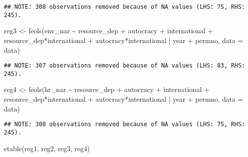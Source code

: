\documentclass[
]{article}
\newenvironment{Shaded}{\begin{snugshade}}{\end{snugshade}}
\newcommand{\AttributeTok}[1]{\textcolor[rgb]{0.77,0.63,0.00}{#1}}
\newcommand{\FunctionTok}[1]{\textcolor[rgb]{0.00,0.00,0.00}{#1}}
\newcommand{\NormalTok}[1]{#1}
\newcommand{\OtherTok}[1]{\textcolor[rgb]{0.56,0.35,0.01}{#1}}
\newcommand{\SpecialCharTok}[1]{\textcolor[rgb]{0.00,0.00,0.00}{#1}}
\begin{document}
\begin{verbatim}
## NOTE: 308 observations removed because of NA values (LHS: 75, RHS: 245).
\end{verbatim}

\begin{Shaded}
\begin{Highlighting}[]
\NormalTok{reg3 }\OtherTok{\textless{}{-}} \FunctionTok{feols}\NormalTok{(env\_nar }\SpecialCharTok{\textasciitilde{}}\NormalTok{ resource\_dep }\SpecialCharTok{+}\NormalTok{ autocracy }\SpecialCharTok{+}\NormalTok{ international }
              \SpecialCharTok{+}\NormalTok{ resource\_dep}\SpecialCharTok{*}\NormalTok{international }\SpecialCharTok{+}\NormalTok{ autocracy}\SpecialCharTok{*}\NormalTok{international }\SpecialCharTok{|}\NormalTok{ year }\SpecialCharTok{+}\NormalTok{ permno, }
              \AttributeTok{data =}\NormalTok{ data)}
\end{Highlighting}
\end{Shaded}

\begin{verbatim}
## NOTE: 307 observations removed because of NA values (LHS: 83, RHS: 245).
\end{verbatim}

\begin{Shaded}
\begin{Highlighting}[]
\NormalTok{reg4 }\OtherTok{\textless{}{-}} \FunctionTok{feols}\NormalTok{(hr\_nar }\SpecialCharTok{\textasciitilde{}}\NormalTok{ resource\_dep }\SpecialCharTok{+}\NormalTok{ autocracy }\SpecialCharTok{+}\NormalTok{ international }
              \SpecialCharTok{+}\NormalTok{ resource\_dep}\SpecialCharTok{*}\NormalTok{international }\SpecialCharTok{+}\NormalTok{ autocracy}\SpecialCharTok{*}\NormalTok{international }\SpecialCharTok{|}\NormalTok{ year }\SpecialCharTok{+}\NormalTok{ permno, }
              \AttributeTok{data =}\NormalTok{ data)}
\end{Highlighting}
\end{Shaded}

\begin{verbatim}
## NOTE: 308 observations removed because of NA values (LHS: 75, RHS: 245).
\end{verbatim}

\begin{Shaded}
\begin{Highlighting}[]
\FunctionTok{etable}\NormalTok{(reg1, reg2, reg3, reg4)}
\end{Highlighting}
\end{Shaded}
\end{document}
